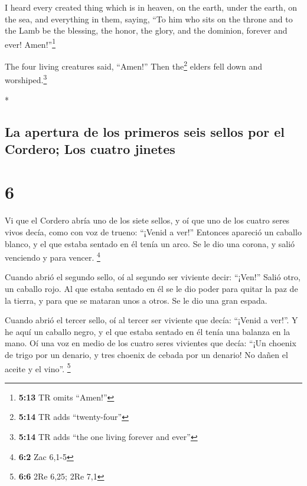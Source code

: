 \begin{paracol}{2}
\begin{otherlanguage}{english}
 I heard every created thing which is in heaven, on the
earth, under the earth, on the sea, and everything in them, saying, ``To
him who sits on the throne and to the Lamb be the blessing, the honor,
the glory, and the dominion, forever and ever! Amen!''\footnote{\textbf{5:13}
  TR omits ``Amen!''}

 The four living creatures said, ``Amen!'' Then
the\footnote{\textbf{5:14} TR adds ``twenty-four''} elders fell down and
worshiped.\footnote{\textbf{5:14} TR adds ``the one living forever and
  ever''}

\end{otherlanguage}

\switchcolumn[0]*

\hypertarget{la-apertura-de-los-primeros-seis-sellos-por-el-cordero-los-cuatro-jinetes}{%
\subsection{La apertura de los primeros seis sellos por el Cordero; Los
cuatro
jinetes}\label{la-apertura-de-los-primeros-seis-sellos-por-el-cordero-los-cuatro-jinetes}}

\hypertarget{section-10}{%
\section{6}\label{section-10}}

 Vi que el Cordero abría uno de los siete sellos, y oí que
uno de los cuatro seres vivos decía, como con voz de trueno: ``¡Venid a
ver!''  Entonces apareció un caballo blanco, y el que
estaba sentado en él tenía un arco. Se le dio una corona, y salió
venciendo y para vencer. \footnote{\textbf{6:2} Zac 6,1-5}

 Cuando abrió el segundo sello, oí al segundo ser viviente
decir: ``¡Ven!''  Salió otro, un caballo rojo. Al que
estaba sentado en él se le dio poder para quitar la paz de la tierra, y
para que se mataran unos a otros. Se le dio una gran espada.

 Cuando abrió el tercer sello, oí al tercer ser viviente
que decía: ``¡Venid a ver!''. Y he aquí un caballo negro, y el que
estaba sentado en él tenía una balanza en la mano.  Oí una
voz en medio de los cuatro seres vivientes que decía: ``¡Un choenix de
trigo por un denario, y tres choenix de cebada por un denario! No dañen
el aceite y el vino''. \footnote{\textbf{6:6} 2Re 6,25; 2Re 7,1}


\end{paracol}
